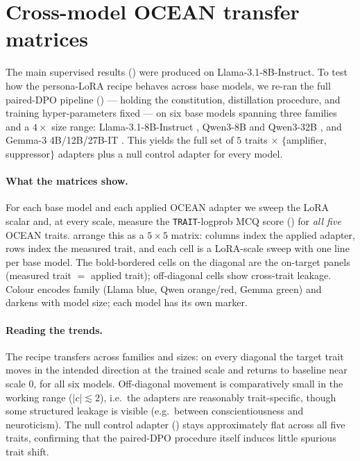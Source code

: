 \section{Cross-model OCEAN transfer matrices}\label{sec:appendix-crossmodel-matrices}

The main supervised results () were produced on
Llama-3.1-8B-Instruct. To test how the persona-LoRA recipe behaves across base
models, we re-ran the full paired-DPO pipeline () ---
holding the constitution, distillation procedure, and training hyper-parameters
fixed --- on six base models spanning three families and a $4\times$ size range:
Llama-3.1-8B-Instruct \citep{grattafiori2024llama}, Qwen3-8B and Qwen3-32B
\citep{qwen2025qwen3}, and Gemma-3 4B/12B/27B-IT \citep{gemma_2025}. This yields
the full set of $5$ traits $\times$ $\{$amplifier, suppressor$\}$ adapters plus a
null control adapter for every model.

\paragraph{What the matrices show.} For each base model and each applied OCEAN
adapter we sweep the LoRA scalar and, at every scale, measure the
\texttt{TRAIT}-logprob MCQ score () for \emph{all five}
OCEAN traits.  arrange
this as a $5\times 5$ matrix: columns index the applied adapter, rows index the
measured trait, and each cell is a LoRA-scale sweep with one line per base
model. The bold-bordered cells on the diagonal are the on-target panels (measured
trait $=$ applied trait); off-diagonal cells show cross-trait leakage. Colour
encodes family (Llama blue, Qwen orange/red, Gemma green) and darkens with model
size; each model has its own marker.

\paragraph{Reading the trends.} The recipe transfers across families and sizes:
on every diagonal the target trait moves in the intended direction at the trained
scale and returns to baseline near scale $0$, for all six models. Off-diagonal
movement is comparatively small in the working range ($|c|\lesssim 2$), i.e.\ the
adapters are reasonably trait-specific, though some structured leakage is visible
(e.g.\ between conscientiousness and neuroticism). The null control adapter
() stays approximately flat across all five
traits, confirming that the paired-DPO procedure itself induces little spurious
trait shift.

